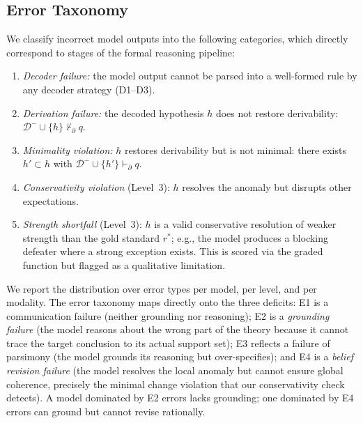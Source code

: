 \documentclass{article}
\theoremstyle{definition}
\newcommand{\Dm}{\mathcal{D}^{-}}
\newcommand{\pPartial}{\vdash_{\partial}}
\begin{document}
\subsection{Error Taxonomy}\label{subsec:errors}

We classify incorrect model outputs into the following categories, which directly correspond to stages of the formal reasoning pipeline:

\begin{enumerate}[label=(E\arabic*),nosep]
    \item \textit{Decoder failure:} the model output cannot be parsed into a well-formed rule by any decoder strategy (D1--D3).
    \item \textit{Derivation failure:} the decoded hypothesis $h$ does not restore derivability: $\Dm \cup \{h\} \not\pPartial q$.
    \item \textit{Minimality violation:} $h$ restores derivability but is not minimal: there exists $h' \subset h$ with $\Dm \cup \{h'\} \pPartial q$.
    \item \textit{Conservativity violation} (Level~3): $h$ resolves the anomaly but disrupts other expectations.
    \item \textit{Strength shortfall} (Level~3): $h$ is a valid conservative resolution of weaker strength than the gold standard $r^*$; e.g., the model produces a blocking defeater where a strong exception exists. This is scored via the graded function but flagged as a qualitative limitation.
\end{enumerate}

We report the distribution over error types per model, per level, and per modality. The error taxonomy maps directly onto the three deficits: E1 is a communication failure (neither grounding nor reasoning); E2 is a \emph{grounding failure} (the model reasons about the wrong part of the theory because it cannot trace the target conclusion to its actual support set); E3 reflects a failure of parsimony (the model grounds its reasoning but over-specifies); and E4 is a \emph{belief revision failure} (the model resolves the local anomaly but cannot ensure global coherence, precisely the minimal change violation that our conservativity check detects). A model dominated by E2 errors lacks grounding; one dominated by E4 errors can ground but cannot revise rationally.
\end{document}
